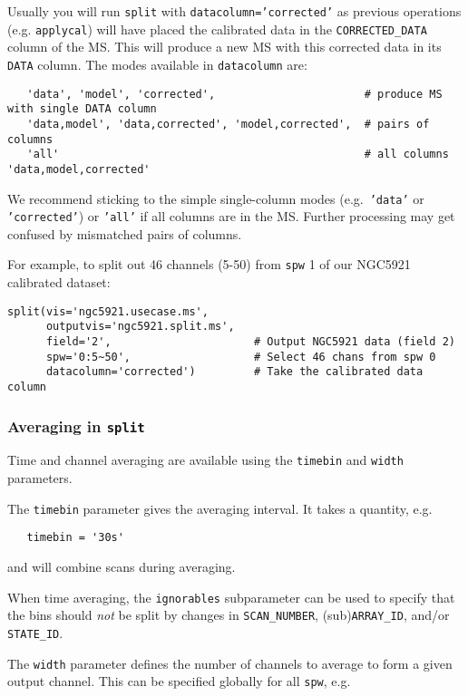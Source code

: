 Usually you will run {\tt split} with {\tt datacolumn='corrected'} as
previous operations (e.g. {\tt applycal}) will have placed the
calibrated data in the {\tt CORRECTED\_DATA} column of the MS.  This
will produce a new MS with this corrected data in its {\tt DATA} 
column.  The modes available in {\tt datacolumn} are:
\small
\begin{verbatim}
   'data', 'model', 'corrected',                       # produce MS with single DATA column
   'data,model', 'data,corrected', 'model,corrected',  # pairs of columns
   'all'                                               # all columns 'data,model,corrected'
\end{verbatim}
\normalsize
We recommend sticking to the simple single-column modes (e.g.\ 
{\tt 'data'} or {\tt 'corrected'}) or {\tt 'all'} if all columns are in
the MS.  Further processing may get confused by mismatched pairs of columns.

For example, to split out 46 channels (5-50) from {\tt spw} 1 of
our NGC5921 calibrated dataset:
\small
\begin{verbatim}
split(vis='ngc5921.usecase.ms',       
      outputvis='ngc5921.split.ms',    
      field='2',                      # Output NGC5921 data (field 2)
      spw='0:5~50',                   # Select 46 chans from spw 0
      datacolumn='corrected')         # Take the calibrated data column
\end{verbatim}
\normalsize

\subsubsection{Averaging in {\tt split}}
\label{section:cal.other.split.average}

Time and channel averaging are available using the {\tt timebin}
and {\tt width} parameters.

The {\tt timebin} parameter gives the averaging interval.  It takes a
quantity, e.g.
\small
\begin{verbatim}
   timebin = '30s'
\end{verbatim}
\normalsize
and will combine scans during averaging.

When time averaging, the {\tt ignorables} subparameter can be used to
specify that the bins should \emph{not} be split by changes in
{\tt SCAN\_NUMBER}, (sub){\tt ARRAY\_ID}, and/or {\tt STATE\_ID}.


The {\tt width} parameter defines the number of channels to average to
form a given output channel.  This can be specified globally for all
{\tt spw}, e.g.


